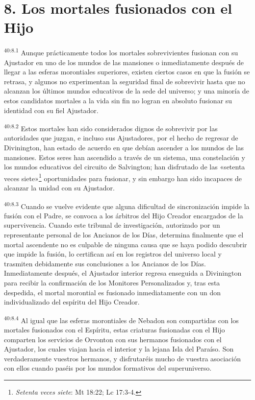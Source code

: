 \section*{8. Los mortales fusionados con el Hijo}
\par
\textsuperscript{40:8.1} Aunque prácticamente todos los mortales sobrevivientes fusionan con su Ajustador en uno de los mundos de las mansiones o inmediatamente después de llegar a las esferas morontiales superiores, existen ciertos casos en que la fusión se retrasa, y algunos no experimentan la seguridad final de sobrevivir hasta que no alcanzan los últimos mundos educativos de la sede del universo; y una minoría de estos candidatos mortales a la vida sin fin no logran en absoluto fusionar su identidad con su fiel Ajustador.

\par
\textsuperscript{40:8.2} Estos mortales han sido considerados dignos de sobrevivir por las autoridades que juzgan, e incluso sus Ajustadores, por el hecho de regresar de Divinington, han estado de acuerdo en que debían ascender a los mundos de las mansiones. Estos seres han ascendido a través de un sistema, una constelación y los mundos educativos del circuito de Salvington; han disfrutado de las «setenta veces siete»\footnote{\textit{Setenta veces siete}: Mt 18:22; Lc 17:3-4.} oportunidades para fusionar, y sin embargo han sido incapaces de alcanzar la unidad con su Ajustador.

\par
\textsuperscript{40:8.3} Cuando se vuelve evidente que alguna dificultad de sincronización impide la fusión con el Padre, se convoca a los árbitros del Hijo Creador encargados de la supervivencia. Cuando este tribunal de investigación, autorizado por un representante personal de los Ancianos de los Días, determina finalmente que el mortal ascendente no es culpable de ninguna causa que se haya podido descubrir que impide la fusión, lo certifican así en los registros del universo local y trasmiten debidamente sus conclusiones a los Ancianos de los Días. Inmediatamente después, el Ajustador interior regresa enseguida a Divinington para recibir la confirmación de los Monitores Personalizados y, tras esta despedida, el mortal morontial es fusionado inmediatamente con un don individualizado del espíritu del Hijo Creador.

\par
\textsuperscript{40:8.4} Al igual que las esferas morontiales de Nebadon son compartidas con los mortales fusionados con el Espíritu, estas criaturas fusionadas con el Hijo comparten los servicios de Orvonton con sus hermanos fusionados con el Ajustador, los cuales viajan hacia el interior y la lejana Isla del Paraíso. Son verdaderamente vuestros hermanos, y disfrutaréis mucho de vuestra asociación con ellos cuando paséis por los mundos formativos del superuniverso.

